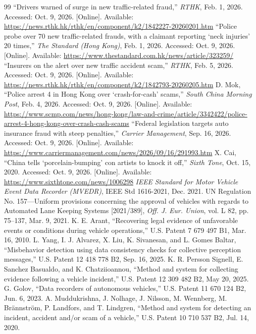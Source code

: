 \begin{thebibliography}{99}
 ``Drivers warned of surge in new traffic-related fraud,'' \emph{RTHK}, Feb. 1, 2026. Accessed: Oct. 9, 2026. [Online]. Available: \url{https://news.rthk.hk/rthk/en/component/k2/1842227-20260201.htm}
 ``Police probe over 70 new traffic-related frauds, with a claimant reporting `neck injuries' 20 times,'' \emph{The Standard (Hong Kong)}, Feb. 1, 2026. Accessed: Oct. 9, 2026. [Online]. Available: \url{https://www.thestandard.com.hk/news/article/323259/}
 ``Insurers on the alert over new traffic accident scam,'' \emph{RTHK}, Feb. 5, 2026. Accessed: Oct. 9, 2026. [Online]. Available: \url{https://news.rthk.hk/rthk/en/component/k2/1842793-20260205.htm}
 D. Mok, ``Police arrest 4 in Hong Kong over `crash-for-cash' scams,'' \emph{South China Morning Post}, Feb. 4, 2026. Accessed: Oct. 9, 2026. [Online]. Available: \url{https://www.scmp.com/news/hong-kong/law-and-crime/article/3342422/police-arrest-4-hong-kong-over-crash-cash-scams}
 ``Federal legislation targets auto insurance fraud with steep penalties,'' \emph{Carrier Management}, Sep. 16, 2026. Accessed: Oct. 9, 2026. [Online]. Available: \url{https://www.carriermanagement.com/news/2026/09/16/291993.htm}
 X. Cai, ``China tells `porcelain-bumping' con artists to knock it off,'' \emph{Sixth Tone}, Oct. 15, 2020. Accessed: Oct. 9, 2026. [Online]. Available: \url{https://www.sixthtone.com/news/1006298}
 \emph{IEEE Standard for Motor Vehicle Event Data Recorder (MVEDR)}, IEEE Std 1616-2021, Dec. 2021.
 UN Regulation No. 157---Uniform provisions concerning the approval of vehicles with regards to Automated Lane Keeping Systems [2021/389], \emph{Off. J. Eur. Union}, vol. L 82, pp. 75--137, Mar. 9, 2021.
 K. E. Arant, ``Recovering legal evidence of unfavorable events or conditions during vehicle operations,'' U.S. Patent 7 679 497 B1, Mar. 16, 2010.
 L. Yang, I. J. Alvarez, X. Liu, K. Sivanesan, and L. Gomes Baltar, ``Misbehavior detection using data consistency checks for collective perception messages,'' U.S. Patent 12 418 778 B2, Sep. 16, 2025.
 K. R. Persson Signell, E. Sanchez Basualdo, and K. Chatziioannou, ``Method and system for collecting evidence following a vehicle incident,'' U.S. Patent 12 309 482 B2, May 20, 2025.
 G. Golov, ``Data recorders of autonomous vehicles,'' U.S. Patent 11 670 124 B2, Jun. 6, 2023.
 A. Muddukrishna, J. Nolhage, J. Nilsson, M. Wennberg, M. Br\"{a}nnstr\"{o}m, P. Landfors, and T. Lindgren, ``Method and system for detecting an incident, accident and/or scam of a vehicle,'' U.S. Patent 10 710 537 B2, Jul. 14, 2020.

\end{thebibliography}
